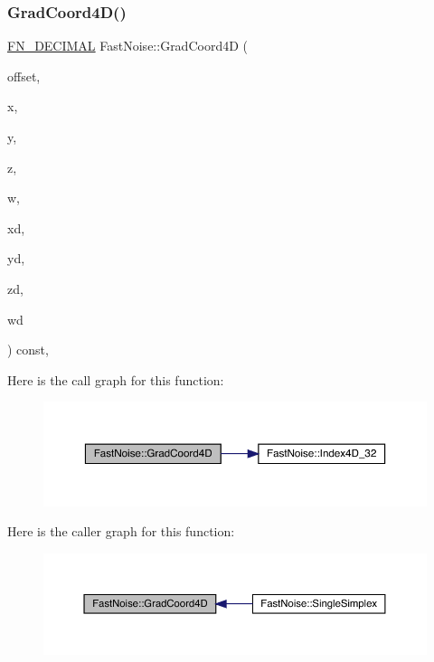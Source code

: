\subsubsection{\texorpdfstring{Grad\+Coord4\+D()}{GradCoord4D()}}
{\footnotesize\ttfamily \mbox{\hyperlink{_fast_noise_8h_a75a9ef6d2541c4921815b885bfd449c3}{F\+N\+\_\+\+D\+E\+C\+I\+M\+AL}} Fast\+Noise\+::\+Grad\+Coord4D (\begin{DoxyParamCaption}\item[{unsigned char}]{offset,  }\item[{int}]{x,  }\item[{int}]{y,  }\item[{int}]{z,  }\item[{int}]{w,  }\item[{\mbox{\hyperlink{_fast_noise_8h_a75a9ef6d2541c4921815b885bfd449c3}{F\+N\+\_\+\+D\+E\+C\+I\+M\+AL}}}]{xd,  }\item[{\mbox{\hyperlink{_fast_noise_8h_a75a9ef6d2541c4921815b885bfd449c3}{F\+N\+\_\+\+D\+E\+C\+I\+M\+AL}}}]{yd,  }\item[{\mbox{\hyperlink{_fast_noise_8h_a75a9ef6d2541c4921815b885bfd449c3}{F\+N\+\_\+\+D\+E\+C\+I\+M\+AL}}}]{zd,  }\item[{\mbox{\hyperlink{_fast_noise_8h_a75a9ef6d2541c4921815b885bfd449c3}{F\+N\+\_\+\+D\+E\+C\+I\+M\+AL}}}]{wd }\end{DoxyParamCaption}) const\hspace{0.3cm}{\ttfamily [inline]}, {\ttfamily [private]}}

Here is the call graph for this function\+:
\nopagebreak
\begin{figure}[H]
\begin{center}
\leavevmode
\includegraphics[width=350pt]{d1/dd8/class_fast_noise_a96464d203e3868b31bcd9248f32ae259_cgraph}
\end{center}
\end{figure}
Here is the caller graph for this function\+:
\nopagebreak
\begin{figure}[H]
\begin{center}
\leavevmode
\includegraphics[width=350pt]{d1/dd8/class_fast_noise_a96464d203e3868b31bcd9248f32ae259_icgraph}
\end{center}
\end{figure}
\mbox{\label{class_fast_noise_a84d51e4e3c6abb7897954a4e77194e03}} 

